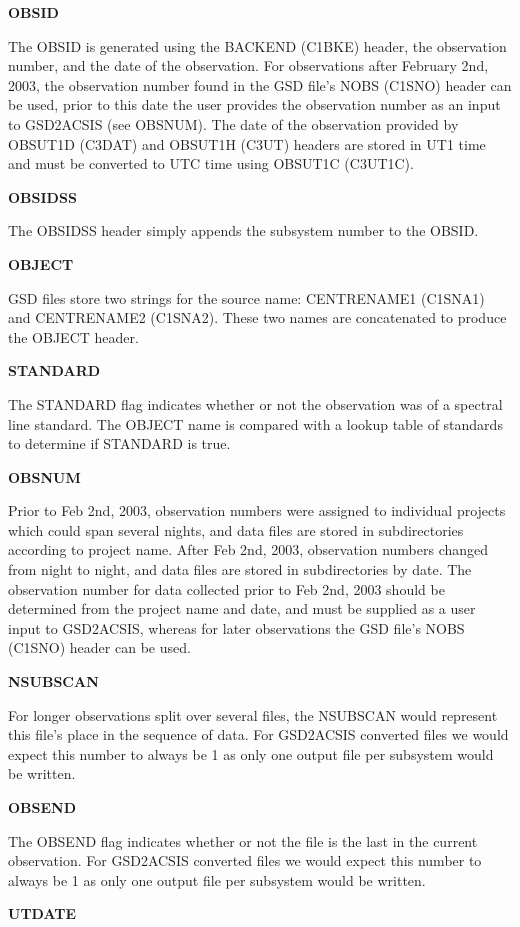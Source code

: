 \documentclass[twoside,11pt]{article}
\renewcommand{\_}{\texttt{\symbol{95}}}
\newcommand{\objectA}{CENTRE\_NAME\_1 (C1SNA1)}
\newcommand{\objectB}{CENTRE\_NAME\_2 (C1SNA2)}
\newcommand{\nObs}{NOBS (C1SNO)}
\newcommand{\backend}{BACKEND (C1BKE)}
\newcommand{\obsUTd}{OBS\_UT1D (C3DAT)}
\newcommand{\obsUTh}{OBS\_UT1H (C3UT)}
\newcommand{\obsUTC}{OBS\_UT1C (C3UT1C)}
\newcommand{\objectA}{CENTRE\_NAME\_1 (C1SNA1)\ref{GSDVars:objectA}}
\newcommand{\objectB}{CENTRE\_NAME\_2 (C1SNA2)\ref{GSDVars:objectB}}
\newcommand{\nObs}{NOBS (C1SNO)\ref{GSDVars:nObs}}
\newcommand{\backend}{BACKEND (C1BKE)\ref{GSDVars:backend}}
\newcommand{\obsUTd}{OBS\_UT1D (C3DAT)\ref{GSDVars:obsUTd}}
\newcommand{\obsUTh}{OBS\_UT1H (C3UT)\ref{GSDVars:obsUTh}}
\newcommand{\obsUTC}{OBS\_UT1C (C3UT1C)\ref{GSDVars:obsUTC}}
\begin{document}
{\bf OBSID}

The OBSID is generated using the \backend{} header, the observation number, and the date of the observation.  For observations after February 2nd, 2003, the observation number found in the GSD file's \nObs{} header can be used, prior to this date the user provides the observation number as an input to GSD2ACSIS (see OBSNUM).  The date of the observation provided by \obsUTd{} and \obsUTh{} headers are stored in UT1 time and must be converted to UTC time using \obsUTC.

{\bf OBSIDSS}

The OBSIDSS header simply appends the subsystem number to the OBSID.

{\bf OBJECT}

GSD files store two strings for the source name: \objectA{} and \objectB.  These two names are concatenated to produce the OBJECT header.  

{\bf STANDARD}

The STANDARD flag indicates whether or not the observation was of a spectral line standard.  The OBJECT name is compared with a lookup table of standards to determine if STANDARD is true.

{\bf OBSNUM}

Prior to Feb 2nd, 2003, observation numbers were assigned to individual projects which could span several nights, and data files are stored in subdirectories according to project name.  After Feb 2nd, 2003, observation numbers changed from night to night, and data files are stored in subdirectories by date.  The observation number for data collected prior to Feb 2nd, 2003 should be determined from the project name and date, and must be supplied as a user input to GSD2ACSIS, whereas for later observations the GSD file's \nObs{} header can be used.

{\bf NSUBSCAN}

For longer observations split over several files, the NSUBSCAN would represent this file's place in the sequence of data.  For GSD2ACSIS converted files we would expect this number to always be 1 as only one output file per subsystem would be written. 

{\bf OBSEND}

The OBSEND flag indicates whether or not the file is the last in the current observation.  For GSD2ACSIS converted files we would expect this number to always be 1 as only one output file per subsystem would be written.

{\bf UTDATE}
\end{document}
